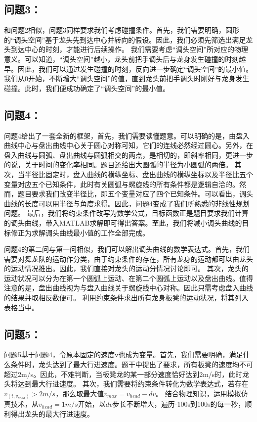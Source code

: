\documentclass{cumcmthesis1}
\begin{document}
\subsection{\textbf{问题3}：}
和问题2相似，问题3同样要求我们考虑碰撞条件。首先，我们需要明确，圆形的“调头空间”基于龙头先到达中心并转向的假设。因此，我们必须先筛选出满足龙头到达中心的时刻，才能进行后续操作。
我们需要考虑“调头空间”所对应的物理意义。可以知道，“调头空间”越小，龙头前把手调头后与龙身发生碰撞的时刻越早。因此，我们可以通过发生碰撞的时刻，反向进一步确定“调头空间”的最小值。
我们从0开始，不断增大“调头空间”的值，直到龙头前把手调头时刚好与龙身发生碰撞。此时，我们便成功确定了“调头空间”的最小值。
\subsection{\textbf{问题4}：}
问题4给出了一套全新的框架，首先，我们需要读懂题意。可以明确的是，由盘入曲线中心与盘出曲线中心关于圆心对称可知，它们的连线必然经过圆心。另外，在盘入曲线与圆弧、盘出曲线与圆弧相交的两点，是相切的，即斜率相同，更进一步的说，关于时间的变化率相同。题目还给出大圆弧的半径为小圆弧的两倍。
其次，当半径比固定时，盘入曲线的横纵坐标、盘出曲线的横纵坐标以及半径比五个变量对应五个已知条件，此时有关圆弧与螺旋线的所有条件都是逻辑自洽的。然而，题目要求我们改变半径比，即五个变量对应了四个已知条件。可以看出，调头曲线的长度可以用半径与角度求得。因此，问题4变成了我们所熟悉的非线性规划问题。
最后，我们将约束条件改写为数学公式，目标函数正是题目要求我们计算的调头曲线，带入MATLAB求解即可得出答案。至此，我们将减小调头曲线的目标修正为求解调头曲线最小值的工作全部完成。
\par
问题4的第二问与第一问相似，我们可以解出调头曲线的数学表达式。首先，我们需要对舞龙队的运动作分类，由于约束条件的存在，所有龙身的运动都可以由龙头的运动情况推出。因此，我们直接对龙头的运动分情况讨论即可。
其次，龙头的运动状况可以分为在第一个圆弧上运动、在第二个圆弧上运动以及盘出曲线。值得注意的是，盘出曲线视为与盘入曲线关于螺旋线中心对称。因此只需考虑盘入曲线的结果并取相反数便可。
利用约束条件求出所有龙身板凳的运动状况，将其列入表格当中。
\subsection{\textbf{问题5}：}
问题5基于问题4，令原本固定的速度v也成为变量。首先，我们需要明确，满足什么条件时，龙头达到了最大行进速度。题干中提出了要求，所有板凳的速度均不可超过2m/s。因此，不难判断，当板凳龙的某一部分速度恰好达到2m/s时，此时龙头将达到最大行进速度。
其次，我们需要将约束条件转化为数学表达式，若存在$v_(t,v_{head})>2m/s$，那么取最大值$v_{max} = v_{head}-dv$。
结合物理知识，运用模拟仿真技术，从$v_{head}=1m/s$开始，以$dv$步长不断增大，遍历-100s到100s的每一秒，顺利得出龙头的最大行进速度。
\end{document}
